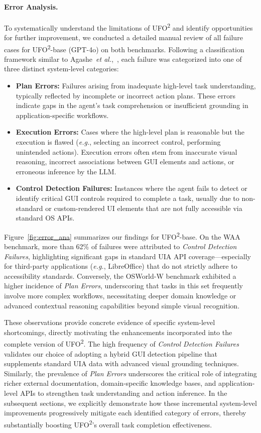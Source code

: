 \documentclass[sigplan,10pt]{acmart}
\newcommand{\name}{\textsc{UFO}\textsuperscript{2}\xspace}
\newcommand{\eg}{\textit{e.g.},\xspace}
\newcommand{\etal}{\textit{et al.},\xspace}
\begin{document}
\paragraph{Error Analysis.}
To systematically understand the limitations of \name and identify opportunities for further improvement, we conducted a detailed manual review of all failure cases for \name-base (GPT-4o) on both benchmarks. Following a classification framework similar to Agashe~\etal~\cite{agasheagent}, each failure was categorized into one of three distinct system-level categories:
\begin{itemize} 
    \item \textbf{Plan Errors:} Failures arising from inadequate high-level task understanding, typically reflected by incomplete or incorrect action plans. These errors indicate gaps in the agent's task comprehension or insufficient grounding in application-specific workflows.
    
    \item \textbf{Execution Errors:} Cases where the high-level plan is reasonable but the execution is flawed (\eg selecting an incorrect control, performing unintended actions). Execution errors often stem from inaccurate visual reasoning, incorrect associations between GUI elements and actions, or erroneous inference by the LLM.
    
    \item \textbf{Control Detection Failures:} Instances where the agent fails to detect or identify critical GUI controls required to complete a task, usually due to non-standard or custom-rendered UI elements that are not fully accessible via standard OS APIs.
\end{itemize}
Figure~\ref{fig:error_ana} summarizes our findings for \name-base. On the WAA benchmark, more than 62\% of failures were attributed to \emph{Control Detection Failures}, highlighting significant gaps in standard UIA API coverage—especially for third-party applications (\eg LibreOffice) that do not strictly adhere to accessibility standards. Conversely, the OSWorld-W benchmark exhibited a higher incidence of \emph{Plan Errors}, underscoring that tasks in this set frequently involve more complex workflows, necessitating deeper domain knowledge or advanced contextual reasoning capabilities beyond simple visual recognition.

These observations provide concrete evidence of specific system-level shortcomings, directly motivating the enhancements incorporated into the complete version of \name. The high frequency of \emph{Control Detection Failures} validates our choice of adopting a hybrid GUI detection pipeline that supplements standard UIA data with advanced visual grounding techniques. Similarly, the prevalence of \emph{Plan Errors} underscores the critical role of integrating richer external documentation, domain-specific knowledge bases, and application-level APIs to strengthen task understanding and action inference. In the subsequent sections, we explicitly demonstrate how these incremental system-level improvements progressively mitigate each identified category of errors, thereby substantially boosting \name's overall task completion effectiveness.
\end{document}
